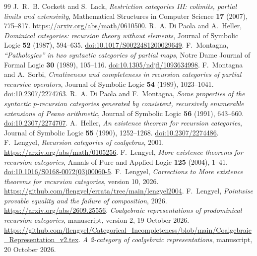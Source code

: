 \documentclass[11pt]{article}
\theoremstyle{definition}
\begin{document}
\begin{thebibliography}{99}
\small
\setlength{\itemsep}{3pt}
 J.~R.~B. Cockett and S.~Lack,
\emph{Restriction categories III: colimits, partial limits and extensivity},
Mathematical Structures in Computer Science \textbf{17} (2007), 775--817.
\url{https://arxiv.org/abs/math/0610500}.
 R.~A. Di Paola and A.~Heller,
\emph{Dominical categories: recursion theory without elements},
Journal of Symbolic Logic \textbf{52} (1987), 594--635.
\href{https://doi.org/10.1017/S0022481200029649}{doi:10.1017/S0022481200029649}.
 F.~Montagna,
\emph{``Pathologies'' in two syntactic categories of partial maps},
Notre Dame Journal of Formal Logic \textbf{30} (1989), 105--116.
\href{https://doi.org/10.1305/ndjfl/1093634998}{doi:10.1305/ndjfl/1093634998}.
 F.~Montagna and A.~Sorbi,
\emph{Creativeness and completeness in recursion categories of partial recursive operators},
Journal of Symbolic Logic \textbf{54} (1989), 1023--1041.
\href{https://doi.org/10.2307/2274763}{doi:10.2307/2274763}.
 R.~A. Di Paola and F.~Montagna,
\emph{Some properties of the syntactic $p$-recursion categories generated
by consistent, recursively enumerable extensions of Peano arithmetic},
Journal of Symbolic Logic \textbf{56} (1991), 643--660.
\href{https://doi.org/10.2307/2274707}{doi:10.2307/2274707}.
 A.~Heller, \emph{An existence theorem for recursion categories},
Journal of Symbolic Logic \textbf{55} (1990), 1252--1268.
\href{https://doi.org/10.2307/2274486}{doi:10.2307/2274486}.
 F.~Lengyel, \emph{Recursion categories of coalgebras},
2001. \url{https://arxiv.org/abs/math/0105256}.
 F.~Lengyel, \emph{More existence theorems for recursion categories},
Annals of Pure and Applied Logic \textbf{125} (2004), 1--41.
\href{https://doi.org/10.1016/S0168-0072(03)00060-5}{doi:10.1016/S0168-0072(03)00060-5}.
 F.~Lengyel,
\emph{Corrections to More existence theorems for recursion categories},
version 10, 2026. \url{https://github.com/flengyel/errata/tree/main/lengyel2004}.
 F.~Lengyel,
\emph{Pointwise provable equality and the failure of composition},
2026. \url{https://arxiv.org/abs/2609.25556}.
\emph{Coalgebraic representations of prodominical recursion categories},
manuscript, version 2, 19 October 2026.
\url{https://github.com/flengyel/Categorical_Incompleteness/blob/main/Coalgebraic_Representation_v2.tex}.
 \emph{A 2-category of coalgebraic representations},
manuscript, 20 October 2026.

\end{thebibliography}
\end{document}
